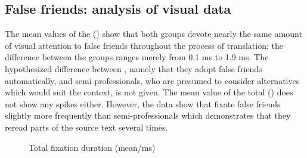 \documentclass[output=paper]{langsci/langscibook.cls}
\begin{document}
\subsection{False friends: analysis of visual data}
The mean values of the  () show that both groups devote nearly the same amount of visual attention to false friends throughout the process of translation: the difference between the groups ranges merely from 0.1 ms to 1.9 ms. The hypothesized difference between , namely that they adopt false friends automatically, and semi professionals, who are presumed to consider alternatives which would suit the context, is not given. The mean value of the total  () does not show any spikes either. However, the  data show that  fixate false friends slightly more frequently than semi-professionals which demonstrates that they reread parts of the source text several times.  

\begin{figure}
    \caption{Total fixation duration (mean/ms)}
    \label{kloster:fig:2}
\end{figure}
\end{document}
